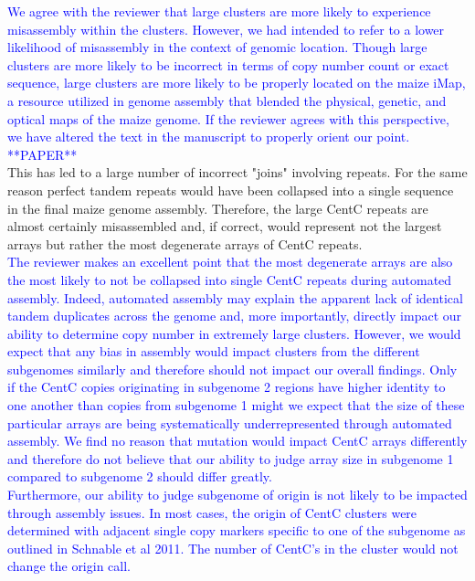 \documentclass[]{article}
\newcommand{\res}[1]{\noindent \textcolor{blue}{{#1}} \\}
\begin{document}
\res{We agree with the reviewer that large clusters are more likely to experience misassembly within the clusters.  
However, we had intended to refer to a lower likelihood of misassembly in the context of genomic location.  
Though large clusters are more likely to be incorrect in terms of copy number count or exact sequence, large clusters are more likely to be properly located on the maize iMap, a resource utilized in genome assembly that blended the physical, genetic, and optical maps of the maize genome.  
If the reviewer agrees with this perspective, we have altered the text in the manuscript to properly orient our point. **PAPER**}

This has led to a large number of incorrect "joins" involving repeats.  
For the same reason perfect tandem repeats would have been collapsed into a single sequence in the final maize genome assembly.  
Therefore, the large CentC repeats are almost certainly misassembled and, if correct, would represent not the largest arrays but rather the most degenerate arrays of CentC repeats.\\

\res{The reviewer makes an excellent point that the most degenerate arrays are also the most likely to not be collapsed into single CentC repeats during automated assembly.
Indeed, automated assembly may explain the apparent lack of identical tandem duplicates across the genome and, more importantly, directly impact our ability to determine copy number in extremely large clusters.  
However, we would expect that any bias in assembly would impact clusters from the different subgenomes similarly and therefore should not impact our overall findings.  Only if the CentC copies originating in subgenome 2 regions have higher identity to one another than copies from subgenome 1 might we expect that the size of these particular arrays are being systematically underrepresented through automated assembly. 
We find no reason that mutation would impact CentC arrays differently and therefore do not believe that our ability to judge array size in subgenome 1 compared to subgenome 2 should differ greatly.}

\res{Furthermore, our ability to judge subgenome of origin is not likely to be impacted through assembly issues. In most cases, the origin of CentC clusters were determined with adjacent single copy markers specific to one of the subgenome as outlined in Schnable et al 2011.  The number of CentC's in the cluster would not change the origin call.}
\end{document}
